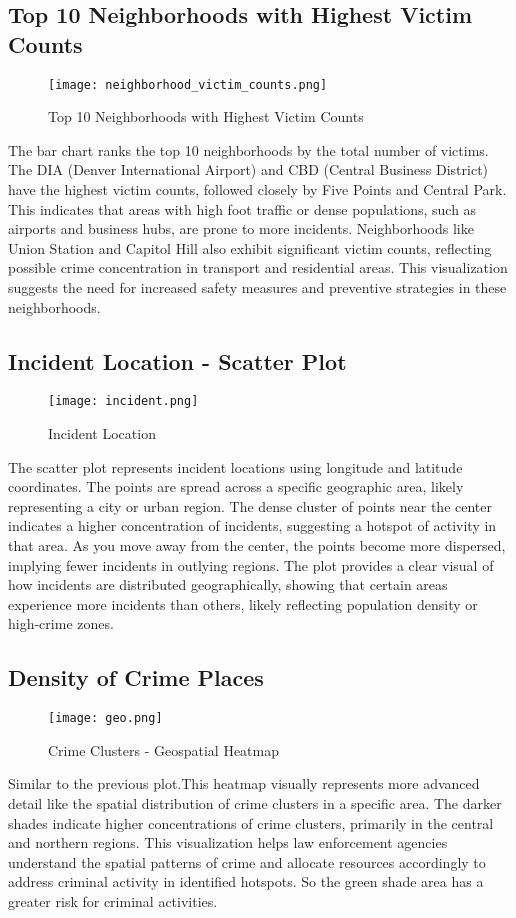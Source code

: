 \documentclass{article}
\begin{document}
\subsection{Top 10 Neighborhoods with Highest Victim Counts}
\begin{figure}[H]
    \centering
    \texttt{[image: neighborhood\_victim\_counts.png]}
    \caption{Top 10 Neighborhoods with Highest Victim Counts}
    \label{fig:neighborhood_victim_counts}
\end{figure}
The bar chart ranks the top 10 neighborhoods by the total number of victims. The DIA (Denver International Airport) and CBD (Central Business District) have the highest victim counts, followed closely by Five Points and Central Park. This indicates that areas with high foot traffic or dense populations, such as airports and business hubs, are prone to more incidents. Neighborhoods like Union Station and Capitol Hill also exhibit significant victim counts, reflecting possible crime concentration in transport and residential areas. This visualization suggests the need for increased safety measures and preventive strategies in these neighborhoods.

\subsection{Incident Location - Scatter Plot}
\begin{figure}[H]
    \centering
    \texttt{[image: incident.png]}
    \caption{Incident Location}
    \label{fig:incident_location}
\end{figure}
The scatter plot represents incident locations using longitude and latitude coordinates. The points are spread across a specific geographic area, likely representing a city or urban region. The dense cluster of points near the center indicates a higher concentration of incidents, suggesting a hotspot of activity in that area. As you move away from the center, the points become more dispersed, implying fewer incidents in outlying regions. The plot provides a clear visual of how incidents are distributed geographically, showing that certain areas experience more incidents than others, likely reflecting population density or high-crime zones.

\subsection{Density of Crime Places}
\begin{figure}[H]
    \centering
    \texttt{[image: geo.png]}
    \caption{Crime Clusters - Geospatial Heatmap}
    \label{fig:incident_location}
\end{figure}
Similar to the previous plot.This heatmap visually represents more advanced detail like the spatial distribution of crime clusters in a specific area. The darker shades indicate higher concentrations of crime clusters, primarily in the central and northern regions. This visualization helps law enforcement agencies understand the spatial patterns of crime and allocate resources accordingly to address criminal activity in identified hotspots. So the green shade area has a greater risk for criminal activities.
\end{document}
